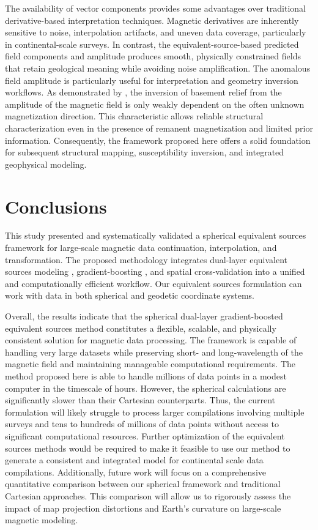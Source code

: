 The availability of vector components provides some advantages over traditional
derivative-based interpretation techniques. Magnetic derivatives are inherently
sensitive to noise, interpolation artifacts, and uneven data coverage,
particularly in continental-scale surveys. In contrast, the
equivalent-source-based predicted field components and amplitude produces
smooth, physically constrained fields that retain geological meaning while
avoiding noise amplification. The anomalous field amplitude is particularly
useful for interpretation and geometry inversion workflows.
As demonstrated by \citet{HidalgoGato2021}, the inversion of basement relief
from the amplitude of the magnetic field is only weakly dependent on the
often unknown magnetization direction. This characteristic allows reliable
structural characterization even in the presence of remanent magnetization
and limited prior information. Consequently, the framework proposed here
offers a solid foundation for subsequent structural mapping, susceptibility
inversion, and integrated geophysical modeling.


\section{Conclusions}

This study presented and systematically validated a spherical equivalent
sources framework for large-scale magnetic data continuation, interpolation,
and transformation. The proposed methodology integrates dual-layer equivalent
sources modeling \citep{Uppal2025}, gradient-boosting \citep{Soler2021},
and spatial cross-validation into a unified and computationally efficient
workflow. Our equivalent sources formulation can work with data in both
spherical and geodetic coordinate systems.

Overall, the results indicate that the spherical dual-layer gradient-boosted
equivalent sources method constitutes a flexible, scalable, and physically
consistent solution for magnetic data processing. The framework is capable of
handling very large datasets while preserving short- and long-wavelength of
the magnetic field and maintaining manageable computational requirements.
The method proposed here is able to handle millions of data points in a modest
computer in the timescale of hours. However, the spherical calculations are
significantly slower than their Cartesian counterparts. Thus, the current
formulation will likely struggle to process larger compilations involving
multiple surveys and tens to hundreds of millions of data points without
access to significant computational resources.
Further optimization of the equivalent sources methods would be required to
make it feasible to use our method to generate a consistent and integrated
model for continental scale data compilations. Additionally, future work
will focus on a comprehensive quantitative comparison between our spherical
framework and traditional Cartesian approaches. This comparison will allow
us to rigorously assess the impact of map projection distortions and Earth's
curvature on large-scale magnetic modeling.

